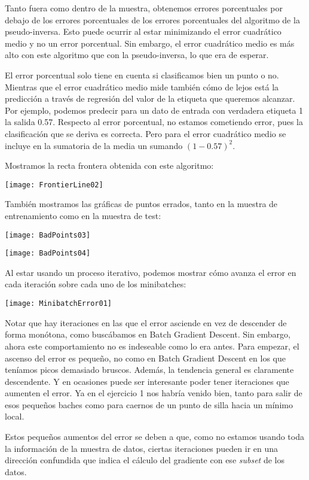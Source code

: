 \documentclass[11pt]{article}
\begin{document}
Tanto fuera como dentro de la muestra, obtenemos errores porcentuales por debajo de los errores porcentuales de los errores porcentuales del algoritmo de la pseudo-inversa. Esto puede ocurrir al estar minimizando el error cuadrático medio y no un error porcentual. Sin embargo, el error cuadrático medio es más alto con este algoritmo que con la pseudo-inversa, lo que era de esperar.

El error porcentual solo tiene en cuenta si clasificamos bien un punto o no. Mientras que el error cuadrático medio mide también cómo de lejos está la predicción a través de regresión del valor de la etiqueta que queremos alcanzar. Por ejemplo, podemos predecir para un dato de entrada con verdadera etiqueta 1 la salida 0.57. Respecto al error porcentual, no estamos cometiendo error, pues la clasificación que se deriva es correcta. Pero para el error cuadrático medio se incluye en la sumatoria de la media un sumando $(1 - 0.57)^2$.

Mostramos la recta frontera obtenida con este algoritmo:

\texttt{[image: FrontierLine02]}

También mostramos las gráficas de puntos errados, tanto en la muestra de entrenamiento como en la muestra de test:

\texttt{[image: BadPoints03]}

\texttt{[image: BadPoints04]}

Al estar usando un proceso iterativo, podemos mostrar cómo avanza el error en cada iteración sobre cada uno de los minibatches:

\texttt{[image: MinibatchError01]}

Notar que hay iteraciones en las que el error asciende en vez de descender de forma monótona, como buscábamos en Batch Gradient Descent. Sin embargo, ahora este comportamiento no es indeseable como lo era antes. Para empezar, el ascenso del error es pequeño, no como en Batch Gradient Descent en los que teníamos picos demasiado bruscos. Además, la tendencia general es claramente descendente. Y en ocasiones puede ser interesante poder tener iteraciones que aumenten el error. Ya en el ejercicio 1 nos habría venido bien, tanto para salir de esos pequeños baches como para caernos de un punto de silla hacia un mínimo local.

Estos pequeños aumentos del error se deben a que, como no estamos usando toda la información de la muestra de datos, ciertas iteraciones pueden ir en una dirección confundida que indica el cálculo del gradiente con ese \emph{subset} de los datos.
\end{document}
